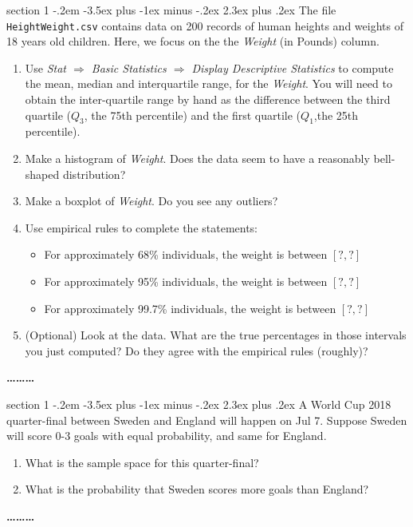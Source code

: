 \documentclass[11pt]{article}
\makeatletter
\newenvironment{problem}{\@startsection
       {section}
       {1}
       {-.2em}
       {-3.5ex plus -1ex minus -.2ex}
       {2.3ex plus .2ex}
       {\pagebreak[3]%
       \large\bf\noindent{Problem }
       }
       }
       {%
       \begin{center}\large\bf \ldots\ldots\ldots\end{center}}
\makeatother
\begin{document}
\begin{problem}{}
The file \texttt{HeightWeight.csv} contains data on 200  records of human heights and weights of 18 years old children.   Here, we focus on the the \textit{Weight} (in Pounds) column.
\begin{enumerate}

\item Use
%
\textit{Stat $\Rightarrow$
        Basic Statistics $\Rightarrow$
        Display Descriptive Statistics}
%
to compute the mean, median and interquartile range, for the \textit{Weight}.  You will need to obtain the inter-quartile range by hand as the difference between the third quartile ($Q_3$, the 75th percentile) and the first quartile ($Q_1$,the 25th percentile). 

\item Make a histogram of \textit{Weight}.  Does the data seem to have a reasonably bell-shaped distribution?  

\item Make a boxplot of \textit{Weight}.  Do you see any outliers?

\item Use empirical rules to complete the statements:
\begin{itemize}
\item For approximately 68\% individuals, the weight is between $[?, ?]$ 
\item For approximately 95\% individuals, the weight is between $[?, ?]$ 
\item For approximately 99.7\% individuals, the weight is between $[?, ?]$ 

\end{itemize}

\item (Optional) Look at the data. What are the true percentages in those intervals you just computed? Do they agree with the empirical rules (roughly)?

\end{enumerate}
\end{problem}

\begin{problem}{}
A World Cup 2018 quarter-final between Sweden and England will happen on Jul 7. Suppose Sweden will score 0-3 goals with equal probability, and same for England. 
\begin{enumerate}
\item What is the sample space for this quarter-final?
\item What is the probability that Sweden scores more goals than England? 
\end{enumerate}
\end{problem}
\end{document}
